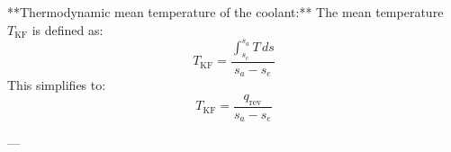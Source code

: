 **Thermodynamic mean temperature of the coolant:**  
The mean temperature \( T_{\text{KF}} \) is defined as:  
\[
T_{\text{KF}} = \frac{\int_{s_e}^{s_a} T \, ds}{s_a - s_e}
\]  
This simplifies to:  
\[
T_{\text{KF}} = \frac{q_{\text{rev}}}{s_a - s_e}
\]  

---